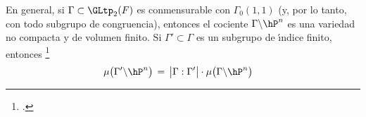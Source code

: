 En general, si $\Gamma\subset\GLtp_{2}(F)$ es conmensurable con
$\Gamma_{0}(1,1)$ (y, por lo tanto, con todo subgrupo de congruencia), entonces
el cociente $\Gamma\backslash\hP^{n}$ es una variedad no compacta y de volumen
finito. Si $\Gamma'\subset\Gamma$ es un subgrupo de \'{\i}ndice finito,
entonces%
\footnote{
	\cite[Ch.~IV,\S~1]{vanDerGeerSurfaces}.
}
\begin{align*}
	\mu\big(\Gamma'\backslash\hP^{n}\big) & \,=\,
		\big|\Gamma:\Gamma'\big|\cdot
			\mu\big(\Gamma\backslash\hP^{n}\big)
\end{align*}
%
